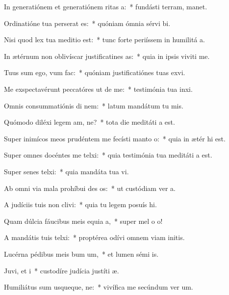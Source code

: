 \item In generatiónem et generatiónem ritas a:~* fundásti terram,  manet.
\item Ordinatióne tua perserat es:~* quóniam ómnia sérvi bi.
\item Nisi quod lex tua meditio  est:~* tunc forte periíssem in humilitá a.
\item In ætérnum non oblivíscar justificatines as:~* quia in ipsis viviti me.
\item Tuus sum ego, vum  fac:~* quóniam justificatiónes tuas exvi.
\item Me exspectavérunt peccatóres ut de me:~* testimónia tua inxi.
\item Omnis consummatiónis di nem:~* latum mandátum tu mis.
\item Quómodo diléxi legem am, ne?~* tota die meditáti a est.
\item Super inimícos meos prudéntem me fecísti manto o:~* quia in ætér hi est.
\item Super omnes docéntes me telxi:~* quia testimónia tua meditáti a est.
\item Super senes telxi:~* quia mandáta tua vi.
\item Ab omni via mala prohíbui des os:~* ut custódiam ver a.
\item A judíciis tuis non clivi:~* quia tu legem posuís hi.
\item Quam dúlcia fáucibus meis equia a,~* super mel o o!
\item A mandátis tuis telxi:~* proptérea odívi omnem viam initis.
\item Lucérna pédibus meis bum um,~* et lumen sémi is.
\item Juvi, et i~* custodíre judícia justíti æ.
\item Humiliátus sum usqueque, ne:~* vivífica me secúndum ver um.
